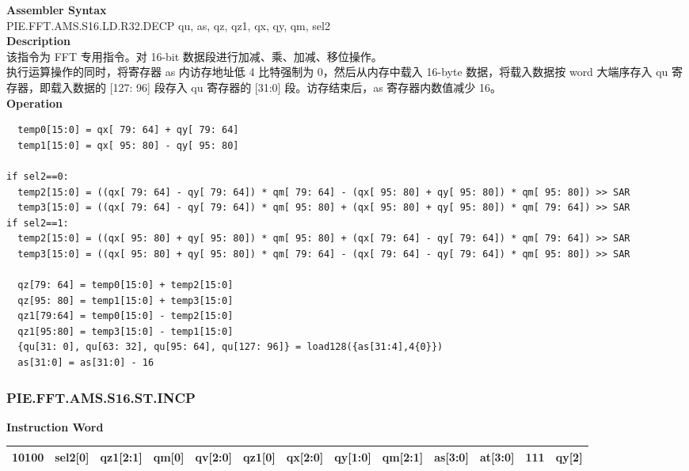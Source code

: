 \textbf{Assembler Syntax} \\
PIE.FFT.AMS.S16.LD.R32.DECP qu, as, qz, qz1, qx, qy, qm, sel2 \\
\textbf{Description} \\
该指令为 FFT 专用指令。对 16-bit 数据段进行加减、乘、加减、移位操作。\\
执行运算操作的同时，将寄存器 as 内访存地址低 4 比特强制为 0，然后从内存中载入 16-byte 数据，将载入数据按 word 大端序存入 qu 寄存器，即载入数据的 [127: 96] 段存入 qu 寄存器的 [31:0] 段。访存结束后，as 寄存器内数值减少 16。\\
\textbf{Operation}
\begin{lstlisting}
  temp0[15:0] = qx[ 79: 64] + qy[ 79: 64]
  temp1[15:0] = qx[ 95: 80] - qy[ 95: 80]

if sel2==0:
  temp2[15:0] = ((qx[ 79: 64] - qy[ 79: 64]) * qm[ 79: 64] - (qx[ 95: 80] + qy[ 95: 80]) * qm[ 95: 80]) >> SAR
  temp3[15:0] = ((qx[ 79: 64] - qy[ 79: 64]) * qm[ 95: 80] + (qx[ 95: 80] + qy[ 95: 80]) * qm[ 79: 64]) >> SAR
if sel2==1:
  temp2[15:0] = ((qx[ 95: 80] + qy[ 95: 80]) * qm[ 95: 80] + (qx[ 79: 64] - qy[ 79: 64]) * qm[ 79: 64]) >> SAR
  temp3[15:0] = ((qx[ 95: 80] + qy[ 95: 80]) * qm[ 79: 64] - (qx[ 79: 64] - qy[ 79: 64]) * qm[ 95: 80]) >> SAR

  qz[79: 64] = temp0[15:0] + temp2[15:0]
  qz[95: 80] = temp1[15:0] + temp3[15:0]
  qz1[79:64] = temp0[15:0] - temp2[15:0]
  qz1[95:80] = temp3[15:0] - temp1[15:0]
  {qu[31: 0], qu[63: 32], qu[95: 64], qu[127: 96]} = load128({as[31:4],4{0}})
  as[31:0] = as[31:0] - 16
\end{lstlisting}

\newpage
\subsubsection{PIE.FFT.AMS.S16.ST.INCP}\label{instruction:PIEFFTAMSS16STINCP}
\setlength\tabcolsep{6pt}
\textbf{Instruction Word} \\
\begin{tabular}{|c|c|c|c|c|c|c|c|c|c|c|c|c|}
	\hline
	10100 & sel2[0] & qz1[2:1] & qm[0] & qv[2:0] & qz1[0] & qx[2:0] & qy[1:0] & qm[2:1] & as[3:0] & at[3:0] & 111 & qy[2] \\
	\hline
\end{tabular}

